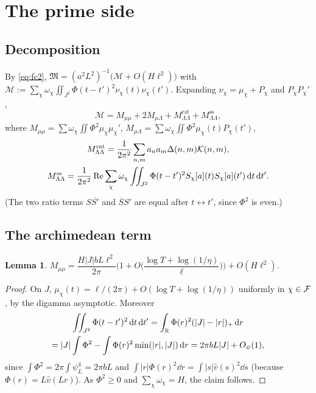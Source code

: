 \documentclass[11pt]{amsart}
\newtheorem{lemma}[theorem]{Lemma}
\theoremstyle{definition}
\theoremstyle{remark}
\numberwithin{equation}{section}
\begin{document}
\section{The prime side}\label{sec:prime}

\subsection{Decomposition}
By \eqref{eq:fc2}, $\mathfrak M=(a^2L^2)^{-1}\big(\mathcal M+O(H\ell^2)\big)$ with $\mathcal M:=\sum_\chi\omega_\chi\iint_{J^2}\Phi(t-t')^2\nu_\chi(t)\nu_\chi(t')$. Expanding $\nu_\chi=\mu_\chi+P_\chi$ and $P_\chi P_\chi'$,
\begin{equation}\label{eq:split}
\mathcal M=M_{\mu\mu}+2M_{\mu\Lambda}+M_{\Lambda\Lambda}^{\mathrm{rat}}+M_{\Lambda\Lambda}^{\mathrm{ss}},
\end{equation}
where $M_{\mu\mu}=\sum\omega_\chi\iint\Phi^2\mu_\chi\mu_\chi'$, $M_{\mu\Lambda}=\sum\omega_\chi\iint\Phi^2\mu_\chi(t)P_\chi(t')$,
\begin{equation}\label{eq:Mrat}\begin{gathered}
M_{\Lambda\Lambda}^{\mathrm{rat}}=\frac1{2\pi^2}\sum_{n,m}a_na_m\Delta(n,m)\mathcal K(n,m),\\
M_{\Lambda\Lambda}^{\mathrm{ss}}=\frac1{2\pi^2}\operatorname{Re}\sum_\chi\omega_\chi\iint_{J^2}\Phi(t-t')^2S_\chi[a](t)S_\chi[a](t')\,\mathrm d t\,\mathrm d t'.
\end{gathered}\end{equation}
(The two ratio terms $S\overline{S'}$ and $\overline SS'$ are equal after $t\leftrightarrow t'$, since $\Phi^2$ is even.)

\subsection{The archimedean term}
\begin{lemma}\label{lem:mumu}
$M_{\mu\mu}=\dfrac{H|J|bL\ell^2}{2\pi}\Big(1+O\Big(\dfrac{\log T+\log(1/\eta)}\ell\Big)\Big)+O(H\ell^2)$.
\end{lemma}
\begin{proof}
On $J$, $\mu_\chi(t)=\ell/(2\pi)+O(\log T+\log(1/\eta))$ uniformly in $\chi\in\mathcal F$, by the digamma asymptotic. Moreover
\begin{multline*}
\iint_{J^2}\Phi(t-t')^2\,\mathrm d t\,\mathrm d t'=\int_\mathbb R\Phi(r)^2(|J|-|r|)_+\,\mathrm d r\\=|J|\int\Phi^2-\int\Phi(r)^2\min(|r|,|J|)\,\mathrm d r=2\pi bL|J|+O_\psi(1),
\end{multline*}
since $\int\Phi^2=2\pi\int\psi_L^4=2\pi bL$ and $\int|r|\Phi(r)^2\dd r=\int|s|\widehat v(s)^2\dd s$ (because $\Phi(r)=L\widehat v(Lr)$). As $\Phi^2\ge0$ and $\sum_\chi\omega_\chi=H$, the claim follows.
\end{proof}
\end{document}
